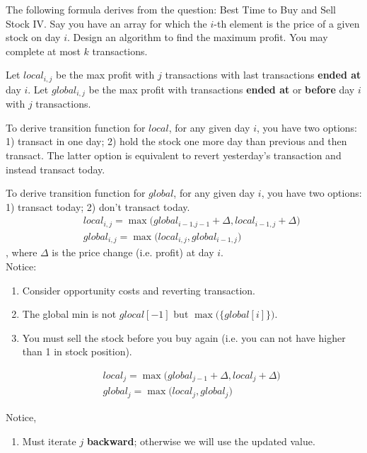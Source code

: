 The following formula derives from the question: Best Time to Buy and Sell Stock IV. Say you have an array for which the $i$-th element is the price of a given stock on day $i$. Design an algorithm to find the maximum profit. You may complete at most $k$ transactions. 

Let $local_{i, j}$ be the max profit with $j$ transactions with last transactions \textbf{ended at} day $i$. Let $global_{i, j}$ be the max profit with transactions \textbf{ended at} or \textbf{before} day $i$ with $j$ transactions. 

To derive transition function for $local$, for any given day $i$, you have two options: 1) transact in one day; 2) hold the stock one more day than previous and then transact. The latter option is equivalent to revert yesterday's transaction and instead transact today. 

To derive transition function for $global$, for any given day $i$, you have two options: 1) transact today; 2) don't transact today. 
\begin{eqnarray*}
&& local_{i,j} = \max\Big(global_{i-1.j-1}+\Delta, local_{i-1,j}+\Delta\Big) \nonumber \\
&& global_{i,j} = \max\Big(local_{i, j}, global_{i-1,j}\Big)
\end{eqnarray*}
, where $\Delta$ is the price change (i.e. profit) at day $i$.\\
Notice:
\begin{enumerate}
\item Consider opportunity costs and reverting transaction.
\item The global min is not $glocal[-1]$ but $\max\big(\{global[i]\}\big)$.
\item You must sell the stock before you buy again (i.e. you can not have higher than 1 in stock position). 
\end{enumerate}

\begin{eqnarray*}
&& local_{j} = \max\Big(global_{j-1} + \Delta, local_{j}+\Delta\Big)
\nonumber \\
&& global_{j} = \max\Big(local_{j}, global_{j}\Big)
\end{eqnarray*}

Notice,
\begin{enumerate}
\item Must iterate $j$ \textbf{backward}; otherwise we will use the updated value. 
\end{enumerate}

